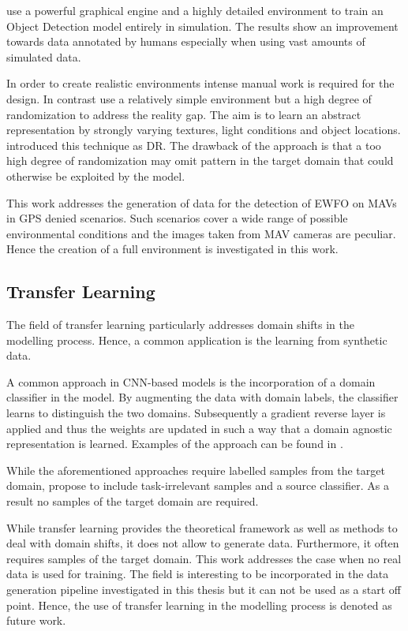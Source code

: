 \citeauthor{Johnson-Roberson2016} \cite{Johnson-Roberson2016} use a powerful graphical engine and a highly detailed environment to train an Object Detection model entirely in simulation. The results show an improvement towards data annotated by humans especially when using vast amounts of simulated data.  

In order to create realistic environments intense manual work is required for the design. In contrast \cite{Sadeghi2016, Tobin2017, Tremblay2018a} use a relatively simple environment but a high degree of randomization to address the reality gap. The aim is to learn an abstract representation by strongly varying textures, light conditions and object locations. \citeauthor{Tobin2017} introduced this technique as \ac{DR}. The drawback of the approach is that a too high degree of randomization may omit pattern in the target domain that could otherwise be exploited by the model. 

This work addresses the generation of data for the detection of \ac{EWFO} on \acp{MAV} in \ac{GPS} denied scenarios. Such scenarios cover a wide range of possible environmental conditions and the images taken from \ac{MAV} cameras are peculiar. Hence the creation of a full environment is investigated in this work. 


\subsection{Transfer Learning}

The field of transfer learning particularly addresses domain shifts in the modelling process. Hence, a common application is the learning from synthetic data.

A common approach in \ac{CNN}-based models is the incorporation of a domain classifier in the model. By augmenting the data with domain labels, the classifier learns to distinguish the two domains. Subsequently a gradient reverse layer is applied and thus the weights are updated in such a way that a domain agnostic representation is learned. Examples of the approach can be found in \cite{Chen2018c} \cite{Xu2017}.

While the aforementioned approaches require labelled samples from the target domain, \citeauthor{Peng2017} \cite{Peng2017} propose to include task-irrelevant samples and a source classifier. As a result no samples of the target domain are required.

While transfer learning provides the theoretical framework as well as methods to deal with domain shifts, it does not allow to generate data. Furthermore, it often requires samples of the target domain. This work addresses the case when no real data is used for training. The field is interesting to be incorporated in the data generation pipeline investigated in this thesis but it can not be used as a start off point. Hence, the use of transfer learning in the modelling process is denoted as future work.

